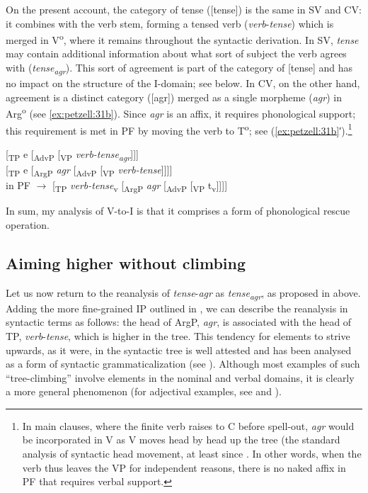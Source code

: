 \documentclass[output=paper,colorlinks,citecolor=brown,draft,draftmode]{langscibook}
\begin{document}
On the present account, the category of tense ([tense]) is the same in SV and CV: it combines with the verb stem, forming a tensed verb (\textit{verb}-\textit{tense}) which is merged in V\textsuperscript{o}, where it remains throughout the syntactic derivation. In SV, \textit{tense} may contain additional information about what sort of subject the verb agrees with (\textit{tense\textsubscript{agr}}). This sort of agreement is part of the category of [tense] and has no impact on the structure of the I-domain; see  below. In CV, on the other hand, agreement is a distinct category ([agr]) merged as a single morpheme (\textit{agr}) in Arg\textsuperscript{o} (see \ref{ex:petzell:31b}). Since \textit{agr} is an affix, it requires phonological support; this requirement is met in PF by moving the verb to T\textsuperscript{o}; see (\ref{ex:petzell:31b}′).\footnote{In
    main clauses, where the finite verb raises to C before spell-out, \textit{agr} would be incorporated in V as V moves head by head up the tree (the standard analysis of syntactic head movement, at least since \citet{Chomsky2001}. In other words, when the verb thus leaves the VP for independent reasons, there is no naked affix in PF that requires verbal support.
}


\ea\label{ex:petzell:31}
\ea\label{ex:petzell:31a}  [\textsubscript{TP} e [\textsubscript{AdvP} [\textsubscript{VP} \textit{verb-tense\textsubscript{agr}}]]]\\
\ex\label{ex:petzell:31b}   [\textsubscript{TP} e [\textsubscript{ArgP} \textit{agr} [\textsubscript{AdvP} [\textsubscript{VP} \textit{verb-tense}]]]]  \\
  in PF $\to$ [\textsubscript{TP} \textit{verb-tense}\textsubscript{v} [\textsubscript{ArgP} \textit{agr} [\textsubscript{AdvP} [\textsubscript{VP} t\textsubscript{v}]]]]
\z
\z


In sum, my analysis of V-to-I is that it comprises a form of phonological rescue operation.


\subsection{Aiming higher without climbing}\label{sec:petzell:5.2}


Let us now return to the reanalysis of \textit{tense}-\textit{agr} as \textit{tense\textsubscript{agr}}, as proposed in  above. Adding the more fine-grained IP outlined in , we can describe the reanalysis in syntactic terms as follows: the head of ArgP, \textit{agr}, is associated with the head of TP, \textit{verb}-\textit{tense}, which is higher in the tree. This tendency for elements to strive upwards, as it were, in the syntactic tree is well attested and has been analysed as a form of syntactic grammaticalization (see \citealt{RobertsRoussou1999,RobertsRoussou2003}). Although most examples of such “tree-climbing” involve elements in the nominal and verbal domains, it is clearly a more general phenomenon (for adjectival examples, see \citealt{Oxford2017} and ).
\end{document}

